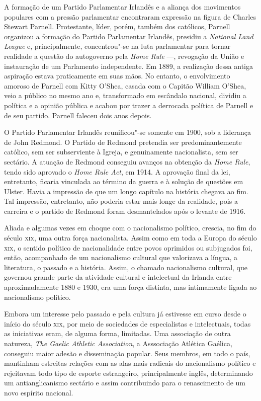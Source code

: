  A formação de um Partido Parlamentar Irlandês e a aliança dos
movimentos populares com a pressão parlamentar encontraram expressão na
figura de Charles Stewart Parnell. Protestante, líder, porém, também
dos católicos, Parnell organizou a formação do Partido Parlamentar
Irlandês, presidiu a \textit{National Land League} e, principalmente,
concentrou"-se na luta parlamentar para tornar realidade a questão do
autogoverno pela \textit{Home Rule} ---, revogação da União e
instauração de um Parlamento independente. Em 1889, a realização dessa
antiga aspiração estava praticamente em suas mãos. No entanto, o
envolvimento amoroso de Parnell com Kitty O’Shea, casada com o Capitão
William O’Shea, veio a público no mesmo ano e, transformado em
escândalo nacional, dividiu a política e a opinião pública e acabou por
trazer a derrocada política de Parnell e de seu partido. Parnell
faleceu dois anos depois.

O Partido Parlamentar Irlandês reunificou"-se somente em 1900, sob a
liderança de John Redmond. O Partido de Redmond  pretendia ser
predominantemente católico, sem ser subserviente à Igreja, e
genuinamente nacionalista, sem ser sectário. A atuação de Redmond
conseguiu avanços na obtenção da \textit{Home Rule}, tendo
sido aprovado o \textit{Home Rule Act}, em 1914. A aprovação
final da lei, entretanto, ficaria vinculada ao término da guerra e à
solução de questões em Ulster. Havia a impressão de que um longo
capítulo na história chegava ao fim. Tal impressão, entretanto, não
poderia estar mais longe da realidade, pois a carreira e o partido de
Redmond foram desmantelados após o levante de 1916. 

Aliada e algumas vezes em choque com o nacionalismo político, crescia,
no fim do século \textsc{xix}, uma outra força nacionalista. Assim como em toda
a Europa do século \textsc{xix}, o sentido político de nacionalidade entre povos
oprimidos ou subjugados foi, então, acompanhado de um nacionalismo
cultural que valorizava a língua, a literatura, o passado e a história.
Assim, o chamado nacionalismo cultural, que governou grande parte da
atividade cultural e intelectual da Irlanda entre aproximadamente 1880
e 1930, era uma força distinta, mas intimamente ligada ao nacionalismo
político.  

Embora um interesse pelo passado e pela cultura já estivesse em curso
desde o início do século \textsc{xix}, por meio de sociedades de especialistas e
intelectuais, todas as iniciativas eram, de alguma forma, limitadas.
Uma associação de outra natureza, \textit{The Gaelic Athletic
Association}, a Asssociação Atlética Gaélica, conseguiu maior adesão e
disseminação popular. Seus membros, em todo o país, mantinham estreitas
relações com as alas mais radicais do nacionalismo político e
rejeitavam todo tipo de esporte estrangeiro, principalmente inglês,
determinando um antianglicanismo sectário e assim contribuindo para o
renascimento de um novo espírito nacional.

